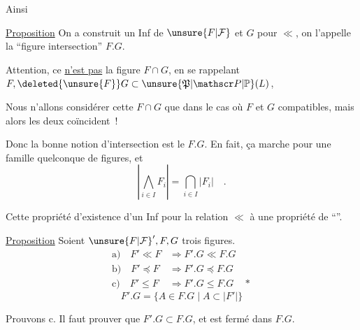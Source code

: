 Ainsi

\uline{Proposition} On a construit un Inf de $\unsure{F|\mathcal F}$ et $G$ pour $\ll$, on l'appelle la ``figure intersection'' $F.G$.

Attention, ce \uline{n'est pas}  la figure $F\cap G$,  en se rappelant $F,\deleted{\unsure{F}}G\subset\unsure{\mathfrak P|\mathscr P|\mathbb P}(L)$, 

Nous n'allons considérer cette $F\cap G$ que dans le cas où $F$ et $G$ compatibles, mais alors les deux coïncident~!

Donc la bonne notion d'intersection est le $F.G$. En fait, ça marche pour une famille quelconque de figures, et
\[
 \left|\bigwedge_{i\in I} F_i\right|=\bigcap_{i\in I}|F_i|\quad .
\]

Cette propriété d'existence d'un Inf pour la relation $\ll$   à une propriété de ``\uline{}''.

\uline{Proposition} Soient ${\unsure{F|\mathcal F}}',F,G$ trois figures.
\[
\begin{aligned}
 \text{a)}\quad F'\ll F&\Longrightarrow F'.G\ll F.G\\
 \text{b)}\quad F'\preceq F&\Longrightarrow F'.G\preceq F.G\\
 \text{c)}\quad F'\leq F&\Longrightarrow F'.G\leq F.G\quad *
\end{aligned}
\]
\[
 F'.G=\{A\in F.G\mid A\subset |F'|\}
\]

Prouvons c. Il faut prouver que  $F'.G\subset F.G$, et est fermé dans $F.G$.

